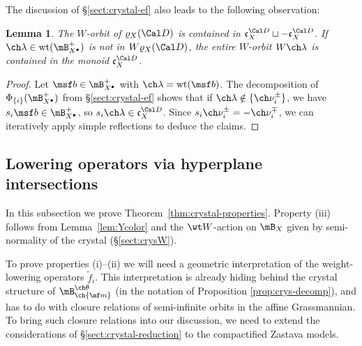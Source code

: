 \documentclass[final]{amsart}
\newtheorem{lem}[subsubsection]{Lemma}
\theoremstyle{remark}
\theoremstyle{definition}
\numberwithin{equation}{section}
\begin{document}
The discussion of \S\ref{sect:crystal-ef} also leads to the following observation:

\begin{lem} \label{lem:plusWorbits}
The $W$-orbit of $\varrho_X(\Cal D)$ is contained in $\mathfrak c_X^{\Cal D} \sqcup -\mathfrak c_X^{\Cal D}$. 
If $\ch\lambda\in \mathrm{wt}(\mB_{X^\bullet}^+)$ is not in $W\varrho_X(\Cal D)$, the entire 
$W$-orbit $W\ch\lambda$ is contained in the monoid $\mathfrak c_X^{\Cal D}$. 
\end{lem}
\begin{proof} Let $\msf b \in \mB_{X^\bullet}^+$ with $\ch\lambda=\mathrm{wt}(\msf b)$. 
The decomposition of $\Phi_{\{i\}}(\mB_{X^\bullet}^+)$ from \S\ref{sect:crystal-ef}
shows that if $\ch\lambda \notin \{\ch\nu_i^\pm\}$, 
we have $s_i\msf b \in \mB^+_{X^\bullet}$, so $s_i\ch\lambda\in \mathfrak c_X^{\Cal D}$.
Since $s_i \ch\nu_i^\pm = -\ch\nu_i^\mp$, we can iteratively 
apply simple reflections to deduce the claims.
\end{proof}



\subsection{Lowering operators via hyperplane intersections} \label{sect:crystal-hw}

In this subsection we prove Theorem~\ref{thm:crystal-properties}. 
Property (iii) follows from Lemma~\ref{lem:Ycolor} and the $\wt W$-action on $\mB_X$ 
given by semi-normality of the crystal (\S\ref{sect:crysW}). 


To prove properties (i)--(ii) we will need a geometric interpretation of the weight-lowering operators $\tilde f_i$. 
This interpretation is already hiding behind the crystal structure of $\mB^{\ch\theta}_{\ch{\mf m}}$ (in the notation of Proposition \ref{prop:crys-decomp}), and has to do with closure relations of semi-infinite orbits in the affine Grassmannian. To bring such closure relations into our discussion, we need to extend the considerations of \S \ref{sect:crystal-reduction} to the compactified Zastava models. 
\end{document}
